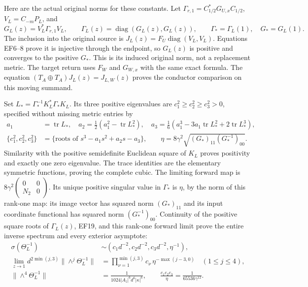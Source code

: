 \documentclass[11pt]{article}
\begin{document}
Here are the actual original norms for these constants.
Let $\Gamma_{r,1}=C_{1/2}^*G_{U,x}C_{1/2}$,
$V_L=C_{-m}P_L$, and
\begin{equation}
 G_L(z)=V_L^*\Gamma_{r,1}V_L,\qquad
 \Gamma_L(z)=\operatorname{diag}(G_L(z),G_L(z)),\qquad
 \Gamma_* =\Gamma_L(1),\quad G_*=G_L(1).
 \tag{EF20}
\end{equation}
The inclusion into the original source is
$J_L(z)=F_U\operatorname{diag}(V_L,V_L)$.
Equations EF6--8 prove it is injective through the
endpoint, so $G_L(z)$ is positive and converges to
the positive $G_*$. This is its induced original norm,
not a replacement metric. The target return uses
$F_W$ and $G_{W,x}$ with the same exact formula.
The equation $(T_A\oplus T_A)J_L(z)=J_{L,W}(z)$
proves the conductor comparison on this moving summand.

Set $L_*=\Gamma_*^{-1}K_L^*\Gamma_*K_L$.
Its three positive eigenvalues are $c_1^2\ge c_2^2\ge c_3^2>0$,
specified without missing metric entries by
\begin{equation}
\begin{aligned}
 a_1&=\operatorname{tr}L_*,\quad
 a_2=\tfrac12(a_1^2-\operatorname{tr}L_*^2),\quad
 a_3=\tfrac16(a_1^3-3a_1\operatorname{tr}L_*^2+2\operatorname{tr}L_*^3),\\
 \{c_1^2,c_2^2,c_3^2\}&=
    \{\text{roots of }s^3-a_1s^2+a_2s-a_3\},\qquad
 \eta=8\gamma^2\sqrt{(G_*)_{11}(G_*^{-1})_{00}}.
\end{aligned}\tag{EF21}
\end{equation}
Similarity with the positive semidefinite Euclidean
square of $K_L$ proves positivity and exactly one zero
eigenvalue. The trace identities are the elementary
symmetric functions, proving the complete cubic.
The limiting forward map is
$8\gamma^2\left(\begin{smallmatrix}0&0\\N_2&0\end{smallmatrix}\right)$.
Its unique positive singular value in $\Gamma_*$ is
$\eta$, by the norm of this rank-one map: its image
vector has squared norm $(G_*)_{11}$ and its input
coordinate functional has squared norm $(G_*^{-1})_{00}$.
Continuity of the positive square roots of $\Gamma_L(z)$,
EF19, and this rank-one forward limit prove the entire
inverse spectrum and every exterior asymptote:
\begin{equation}
\begin{aligned}
 \sigma(\Theta_L^{-1})&\sim
       (c_1d^{-2},c_2d^{-2},c_3d^{-2},\eta^{-1}),\\
 \lim_{z\to1}d^{2\min(j,3)}\|\wedge^j\Theta_L^{-1}\|
       &=\prod_{\nu=1}^{\min(j,3)}c_\nu\,
           \eta^{-\max(j-3,0)}\quad(1\le j\le4),\\
 \|\wedge^4\Theta_L^{-1}\|
       &=\frac1{1024|A_z|^6d^6|\kappa|^6},\qquad
 \frac{c_1c_2c_3}{\eta}=\frac1{65536\gamma^{12}}.
\end{aligned}\tag{EF22}
\end{equation}
\end{document}
